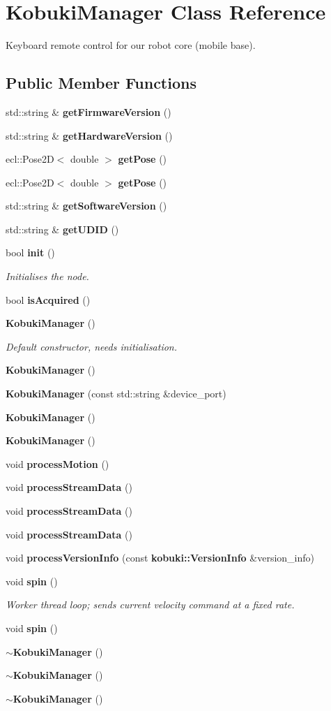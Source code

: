 \section{\-Kobuki\-Manager \-Class \-Reference}
\label{classKobukiManager}


\-Keyboard remote control for our robot core (mobile base).  


\subsection*{\-Public \-Member \-Functions}
\begin{DoxyCompactItemize}
\item 
std\-::string \& {\bf get\-Firmware\-Version} ()
\item 
std\-::string \& {\bf get\-Hardware\-Version} ()
\item 
ecl\-::\-Pose2\-D$<$ double $>$ {\bf get\-Pose} ()
\item 
ecl\-::\-Pose2\-D$<$ double $>$ {\bf get\-Pose} ()
\item 
std\-::string \& {\bf get\-Software\-Version} ()
\item 
std\-::string \& {\bf get\-U\-D\-I\-D} ()
\item 
bool {\bf init} ()
\begin{DoxyCompactList}\small\item\em \-Initialises the node. \end{DoxyCompactList}\item 
bool {\bf is\-Acquired} ()
\item 
{\bf \-Kobuki\-Manager} ()
\begin{DoxyCompactList}\small\item\em \-Default constructor, needs initialisation. \end{DoxyCompactList}\item 
{\bf \-Kobuki\-Manager} ()
\item 
{\bf \-Kobuki\-Manager} (const std\-::string \&device\-\_\-port)
\item 
{\bf \-Kobuki\-Manager} ()
\item 
{\bf \-Kobuki\-Manager} ()
\item 
void {\bf process\-Motion} ()
\item 
void {\bf process\-Stream\-Data} ()
\item 
void {\bf process\-Stream\-Data} ()
\item 
void {\bf process\-Stream\-Data} ()
\item 
void {\bf process\-Version\-Info} (const {\bf kobuki\-::\-Version\-Info} \&version\-\_\-info)
\item 
void {\bf spin} ()
\begin{DoxyCompactList}\small\item\em \-Worker thread loop; sends current velocity command at a fixed rate. \end{DoxyCompactList}\item 
void {\bf spin} ()
\item 
{\bf $\sim$\-Kobuki\-Manager} ()
\item 
{\bf $\sim$\-Kobuki\-Manager} ()
\item 
{\bf $\sim$\-Kobuki\-Manager} ()
\end{DoxyCompactItemize}

